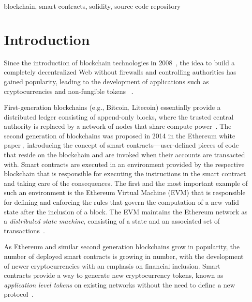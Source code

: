 \documentclass[10pt,conference]{IEEEtran}
\begin{document}
	\begin{IEEEkeywords}
		blockchain, smart contracts, solidity, source code repository
	\end{IEEEkeywords}
	
	\section{Introduction}
	\label{sec:intro}
	Since the introduction of blockchain technologies in 2008~\cite{bitcoinpaper}, the idea to build a completely decentralized Web without firewalls and controlling authorities has gained popularity, leading to the development of applications such as cryptocurrencies and non-fungible tokens ~\cite{crossblockchain}.
	
	First-generation blockchains (e.g., Bitcoin, Litecoin) essentially provide a distributed ledger consisting of append-only blocks, where the trusted central authority is replaced by a network of nodes that share compute power~\cite{blockchainsurvey}. The second generation of blockchains was proposed in 2014 in the Ethereum white paper \cite{ethpaper}, introducing the concept of smart contracts---user-defined pieces of code that reside on the blockchain and are invoked when their accounts are transacted with. Smart contracts are executed in an environment provided by the respective blockchain that is responsible for executing the instructions in the smart contract and taking care of the consequences. The first and the most important example of such an environment is the Ethereum Virtual Machine (EVM) that is responsible for defining and enforcing the rules that govern the computation of a new valid state after the inclusion of a block. The EVM maintains the Ethereum network as a \textit{distributed state machine}, consisting of a state and an associated set of transactions~\cite{wood2019ethereum}. %
	
	As Ethereum and similar second generation blockchains grow in popularity, the number of deployed smart contracts is growing in number, with the development of newer cryptocurrencies with an emphasis on financial inclusion. Smart contracts provide a way to generate new cryptocurrency tokens, known as \textit{application level tokens} on existing networks without the need to define a new protocol~\cite{commonshood}.
	
\end{document}
